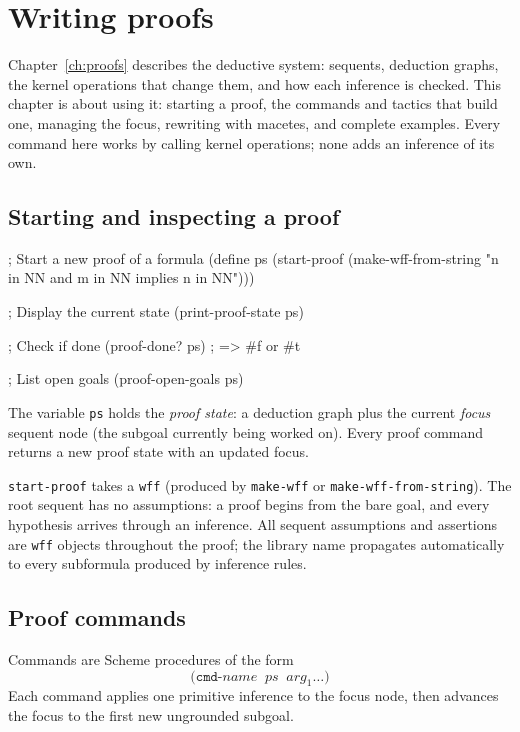 \chapter{Writing proofs}
\label{ch:writing-proofs}

Chapter~\ref{ch:proofs} describes the deductive system: sequents,
deduction graphs, the kernel operations that change them, and how
each inference is checked.  This chapter is about using it: starting a
proof, the commands and tactics that build one, managing the focus,
rewriting with macetes, and complete examples.  Every command here
works by calling kernel operations; none adds an inference of its own.

\section{Starting and inspecting a proof}

\begin{VNBcode}
; Start a new proof of a formula
(define ps (start-proof (make-wff-from-string
  "n in NN and m in NN implies n in NN")))

; Display the current state
(print-proof-state ps)

; Check if done
(proof-done? ps)   ; => #f or #t

; List open goals
(proof-open-goals ps)
\end{VNBcode}

The variable \texttt{ps} holds the \emph{proof state}: a deduction graph
plus the current \emph{focus} sequent node (the subgoal currently being
worked on).  Every proof command returns a new proof state with an
updated focus.

\texttt{start-proof} takes a \texttt{wff} (produced by \texttt{make-wff} or \texttt{make-wff-from-string}).
The root sequent has no assumptions: a proof begins from the bare goal,
and every hypothesis arrives through an inference.  All sequent assumptions and assertions are
\texttt{wff} objects throughout the proof; the library name propagates
automatically to every subformula produced by inference rules.

\section{Proof commands}
\label{sec:commands}

Commands are Scheme procedures of the form
\[
  \texttt{(cmd-}\mathit{name}\;\; \mathit{ps}\;\; \mathit{arg}_1 \ldots\texttt{)}
\]
Each command applies one primitive inference to the focus node, then
advances the focus to the first new ungrounded subgoal.

